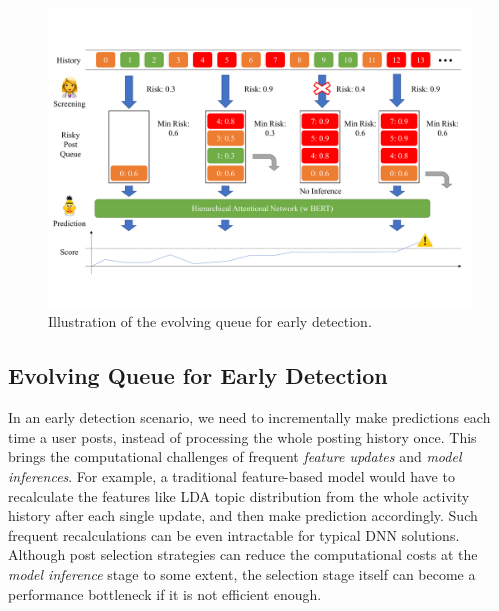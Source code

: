 \begin{figure}[htbp]
    \centering
    \includegraphics[width=1.8\columnwidth]{figures/evolving.pdf}
    \caption{Illustration of the evolving queue for early detection.}
    \label{fig:evolving}
\end{figure}

\subsection{Evolving Queue for Early Detection}
\label{sec:evolving}

In an early detection scenario, we need to incrementally make predictions each time a user posts, instead of processing the whole posting history once.
This brings the computational challenges of frequent \textit{feature updates} and \textit{model inferences}. For example, a traditional feature-based model would have to recalculate the features like LDA topic distribution \citep{blei2003latent} from the whole activity history after each single update, and then make prediction accordingly. Such frequent recalculations can be even intractable for typical DNN solutions. Although post selection strategies can reduce the computational costs at the \textit{model inference} stage to some extent, the selection stage itself can become a performance bottleneck if it is not efficient enough. 

